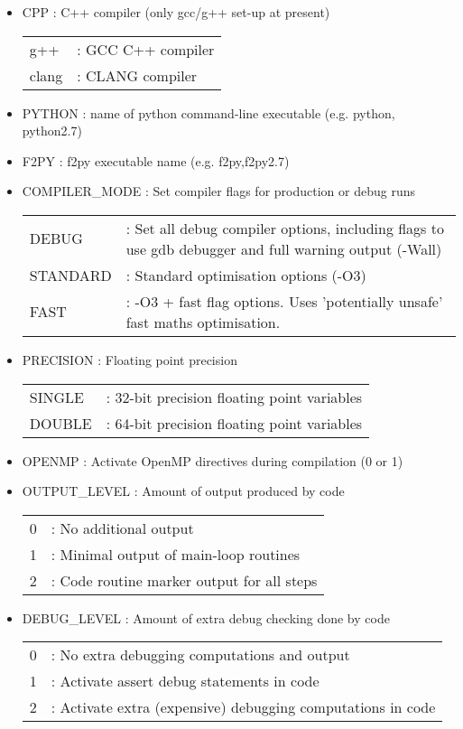 \documentclass[a4paper]{article}
\begin{document}
\begin{itemize}

\item CPP : C++ compiler (only gcc/g++ set-up at present) \\
\begin{tabular}{ll}
g++ & : GCC C++ compiler \\
clang & : CLANG compiler
\end{tabular}

\item PYTHON : name of python command-line executable (e.g. python, python2.7)

\item F2PY : f2py executable name (e.g. f2py,f2py2.7)

\item COMPILER\_MODE : Set compiler flags for production or debug runs \\
\begin{tabular}{ll}
DEBUG & : Set all debug compiler options, including flags to use gdb debugger and full warning output (-Wall) \\
STANDARD & : Standard optimisation options (-O3) \\
FAST & : -O3 + fast flag options.  Uses 'potentially unsafe' fast maths optimisation.  
\end{tabular}

\item PRECISION : Floating point precision \\
\begin{tabular}{ll}
SINGLE & : 32-bit precision floating point variables \\
DOUBLE & : 64-bit precision floating point variables
\end{tabular}

\item OPENMP : Activate OpenMP directives during compilation (0 or 1)

\item OUTPUT\_LEVEL : Amount of output produced by code \\
\begin{tabular}{ll}
0 & : No additional output \\
1 & : Minimal output of main-loop routines \\
2 & : Code routine marker output for all steps
\end{tabular}

\item DEBUG\_LEVEL : Amount of extra debug checking done by code \\
\begin{tabular}{ll}
0 & : No extra debugging computations and output \\
1 & : Activate assert debug statements in code \\
2 & : Activate extra (expensive) debugging computations in code
\end{tabular}


\end{itemize}
\end{document}
